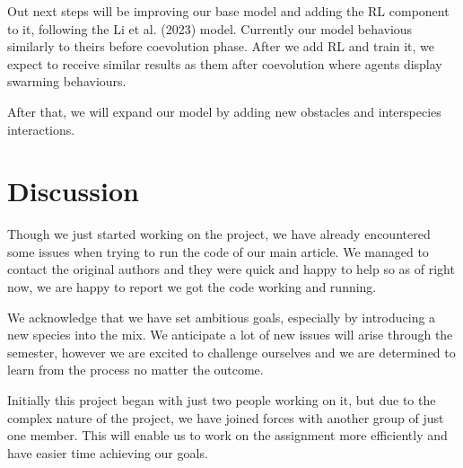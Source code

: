 \documentclass[9pt]{pnas-new}
\begin{document}
Out next steps will be improving our base model and adding the RL component to it, following the Li et al. (2023) model. Currently our model behavious similarly to theirs before coevolution phase. After we add RL and train it, we expect to receive similar results as them after coevolution where agents display swarming behaviours. 

After that, we will expand our model by adding new obstacles and interspecies interactions. 

\section*{Discussion}
Though we just started working on the project, we have already encountered some issues when trying to run the code of our main article. We managed to contact the original authors and they were quick and happy to help so as of right now, we are happy to report we got the code working and running. 

We acknowledge that we have set ambitious goals, especially by introducing a new species into the mix. We anticipate a lot of new issues will arise through the semester, however we are excited to challenge ourselves and we are determined to learn from the process no matter the outcome.

Initially this project began with just two people working on it, but due to the complex nature of the project, we have joined forces with another group of just one member. This will enable us to work on the assignment more efficiently and have easier time achieving our goals.


\showacknow %


\begin{multicols}{2}
\end{multicols}
\end{document}
